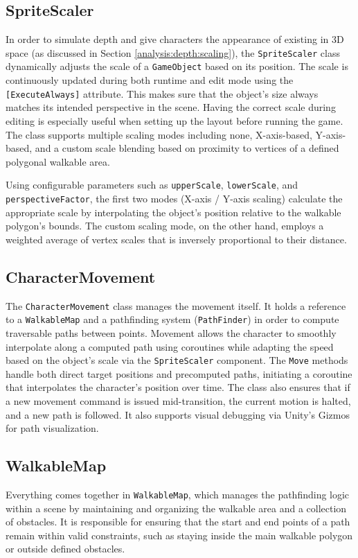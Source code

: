 \subsection{SpriteScaler}
In order to simulate depth and give characters the appearance of existing in 3D space (as discussed in Section \ref{analysis:depth:scaling}), the \verb|SpriteScaler| class dynamically adjusts the scale of a \verb|GameObject| based on its position.  The scale is continuously updated during both runtime and edit mode using the \verb|[ExecuteAlways]| attribute. This makes sure that the object's size always matches its intended perspective in the scene. Having the correct scale during editing is especially useful when setting up the layout before running the game. The class supports multiple scaling modes including none, X-axis-based, Y-axis-based, and a custom scale blending based on proximity to vertices of a defined polygonal walkable area.

Using configurable parameters such as \verb|upperScale|, \verb|lowerScale|, and \verb|perspectiveFactor|, the first two modes (X-axis / Y-axis scaling)  calculate the appropriate scale by interpolating the object's position relative to the walkable polygon’s bounds. The custom scaling mode, on the other hand, employs a weighted average of vertex scales that is inversely proportional to their distance. 


\subsection{CharacterMovement}
The \verb|CharacterMovement| class manages the movement itself. It holds a reference to a \verb|WalkableMap| and a pathfinding system (\verb|PathFinder|) in order to compute traversable paths between points. Movement allows the character to smoothly interpolate along a computed path using coroutines while adapting the speed based on the object's scale via the \verb|SpriteScaler| component. The \verb|Move| methods handle both direct target positions and precomputed paths, initiating a coroutine that interpolates the character’s position over time. The class also ensures that if a new movement command is issued mid-transition, the current motion is halted, and a new path is followed. It also supports visual debugging via Unity’s Gizmos for path visualization.

 
\subsection{WalkableMap}
Everything comes together in \verb|WalkableMap|, which manages the pathfinding logic within a scene by maintaining and organizing the walkable area and a collection of obstacles. It is responsible for ensuring that the start and end points of a path remain within valid constraints, such as staying inside the main walkable polygon or outside defined obstacles.

